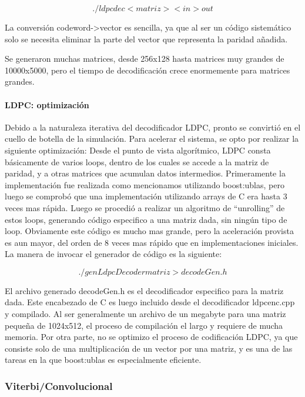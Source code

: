 $$ ./ldpcdec <matriz> <in >out $$

La conversión codeword->vector es sencilla, ya que al ser un código sistemático solo se necesita eliminar la parte del vector que representa la paridad añadida.

Se generaron muchas matrices, desde 256x128 hasta matrices muy grandes de 10000x5000, pero el tiempo de decodificación crece enormemente para matrices grandes.

\paragraph{LDPC: optimización}

Debido a la naturaleza iterativa del decodificador LDPC, pronto se convirtió en el cuello de botella de la simulación. Para acelerar el sistema, se opto por realizar la siguiente optimización:
Desde el punto de vista algorítmico, LDPC consta básicamente de varios loops, dentro de los cuales se accede a la matriz de paridad, y a otras matrices que acumulan datos intermedios. Primeramente la implementación fue realizada como mencionamos utilizando boost:ublas, pero luego se comprobó que una implementación utilizando arrays de C era hasta 3 veces mas rápida.
Luego se procedió a realizar un algoritmo de ``unrolling'' de estos loops, generando código especifico a una matriz dada, sin ningún tipo de loop. Obviamente este código es mucho mas grande, pero la aceleración provista es aun mayor, del orden de 8 veces mas rápido que en implementaciones iniciales.
La manera de invocar el generador de código es la siguiente:

$$ ./genLdpcDecoder matriz  > decodeGen.h $$

El archivo generado decodeGen.h es el decodificador especifico para la matriz dada. Este encabezado de C es luego incluido desde el decodificador ldpcenc.cpp y compilado. Al ser generalmente un archivo de un megabyte para una matriz pequeña de 1024x512, el proceso de compilación el largo y requiere de mucha memoria.
Por otra parte, no se optimizo el proceso de codificación LDPC, ya que consiste solo de una multiplicación de un vector por una matriz, y es una de las tareas en la que boost:ublas es especialmente eficiente.

\subsubsection{Viterbi/Convolucional}

